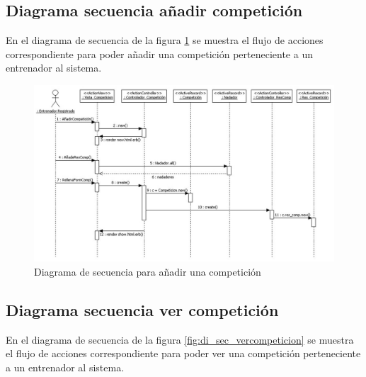 		\subsection{Diagrama secuencia añadir competición} %
		  \label{sub:diagrama_secuencia_anadir_competicion}
		
		  En el diagrama de secuencia de la figura \ref{fig:di_sec_anadircompeticion} se muestra el flujo de acciones correspondiente para poder añadir una competición perteneciente a un entrenador al sistema.
		  
		  \begin{figure}[H]
			  \centering
			    \includegraphics[width=15cm]{./eps/di_diagsecuencia/Competicion_Anadir.eps}
			  \caption{Diagrama de secuencia para añadir una competición}
			  \label{fig:di_sec_anadircompeticion}
			\end{figure}
			
			\newpage
		
		\subsection{Diagrama secuencia ver competición} %
		  \label{sub:diagrama_secuencia_ver_competicion}
		  
		  En el diagrama de secuencia de la figura \ref{fig:di_sec_vercompeticion} se muestra el flujo de acciones correspondiente para poder ver una competición perteneciente a un entrenador al sistema.
		  
